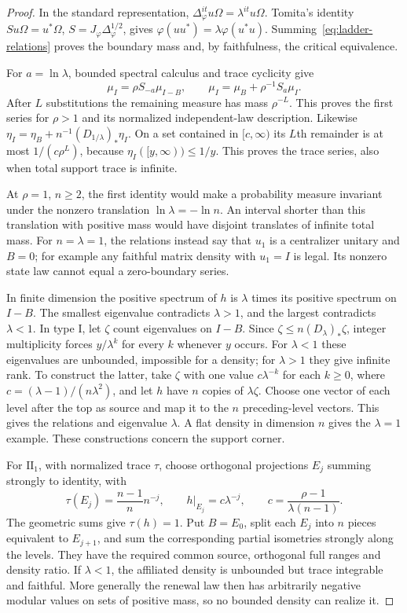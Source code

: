 \begin{proof}
In the standard representation, $\Delta_\varphi^{it}u\Omega=\lambda^{it}u\Omega$. Tomita's identity $Su\Omega=u^*\Omega$, $S=J_\varphi\Delta_\varphi^{1/2}$, gives $\varphi(uu^*)=\lambda\varphi(u^*u)$. Summing~\eqref{eq:ladder-relations} proves the boundary mass and, by faithfulness, the critical equivalence.

For $a=\ln\lambda$, bounded spectral calculus and trace cyclicity give
\[
 \mu_I=\rho S_{-a}\mu_{I-B},\qquad
 \mu_I=\mu_B+\rho^{-1}S_a\mu_I.
\]
After $L$ substitutions the remaining measure has mass $\rho^{-L}$. This proves the first series for $\rho>1$ and its normalized independent-law description. Likewise $\eta_I=\eta_B+n^{-1}(D_{1/\lambda})_*\eta_I$. On a set contained in $[c,\infty)$ its $L$th remainder is at most $1/(c\rho^L)$, because $\eta_I([y,\infty))\le1/y$. This proves the trace series, also when total support trace is infinite.

At $\rho=1$, $n\ge2$, the first identity would make a probability measure invariant under the nonzero translation $\ln\lambda=-\ln n$. An interval shorter than this translation with positive mass would have disjoint translates of infinite total mass. For $n=\lambda=1$, the relations instead say that $u_1$ is a centralizer unitary and $B=0$; for example any faithful matrix density with $u_1=I$ is legal. Its nonzero state law cannot equal a zero-boundary series.

In finite dimension the positive spectrum of $h$ is $\lambda$ times its positive spectrum on $I-B$. The smallest eigenvalue contradicts $\lambda>1$, and the largest contradicts $\lambda<1$. In type I, let $\zeta$ count eigenvalues on $I-B$. Since $\zeta\le n(D_\lambda)_*\zeta$, integer multiplicity forces $y/\lambda^k$ for every $k$ whenever $y$ occurs. For $\lambda<1$ these eigenvalues are unbounded, impossible for a density; for $\lambda>1$ they give infinite rank. To construct the latter, take $\zeta$ with one value $c\lambda^{-k}$ for each $k\ge0$, where $c=(\lambda-1)/(n\lambda^2)$, and let $h$ have $n$ copies of $\lambda\zeta$. Choose one vector of each level after the top as source and map it to the $n$ preceding-level vectors. This gives the relations and eigenvalue $\lambda$. A flat density in dimension $n$ gives the $\lambda=1$ example. These constructions concern the support corner.

For $\mathrm{II}_1$, with normalized trace $\tau$, choose orthogonal projections $E_j$ summing strongly to identity, with
\[
 \tau(E_j)=\frac{n-1}{n}n^{-j},\qquad
 h|_{E_j}=c\lambda^{-j},\qquad c=\frac{\rho-1}{\lambda(n-1)}.
\]
The geometric sums give $\tau(h)=1$. Put $B=E_0$, split each $E_j$ into $n$ pieces equivalent to $E_{j+1}$, and sum the corresponding partial isometries strongly along the levels. They have the required common source, orthogonal full ranges and density ratio. If $\lambda<1$, the affiliated density is unbounded but trace integrable and faithful. More generally the renewal law then has arbitrarily negative modular values on sets of positive mass, so no bounded density can realize it.


\end{proof}
